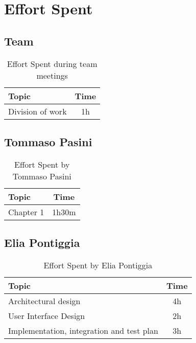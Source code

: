 \chapter{Effort Spent}

\section*{Team}


\begin{table}[H]
    \renewcommand{\arraystretch}{1.5}
    \centering
    \begin{tabular}{|l|c|}
        \hline
        \textbf{Topic}   & \textbf{Time} \\ \hline
        Division of work & 1h            \\ \hline
    \end{tabular}
    \caption{Effort Spent during team meetings}
    \label{tab:group-effort-spent}
\end{table}

\section*{Tommaso Pasini}
\begin{table}[H]
    \renewcommand{\arraystretch}{1.5}
    \centering
    \begin{tabular}{|l|c|}
        \hline
        \textbf{Topic}              & \textbf{Time}     \\ \hline
        Chapter 1                   & 1h30m             \\ \hline
        
    \end{tabular}
    \caption{Effort Spent by Tommaso Pasini}
    \label{tab:pasini-effort-spent}
\end{table}

\section*{Elia Pontiggia}
\begin{table}[H]
    \renewcommand{\arraystretch}{1.5}
    \centering
    \begin{tabular}{|l|c|}
        \hline
        \textbf{Topic}                            & \textbf{Time} \\ \hline
        Architectural design                      & 4h            \\ \hline
        User Interface Design                     & 2h            \\ \hline
        Implementation, integration and test plan & 3h            \\ \hline
    \end{tabular}
    \caption{Effort Spent by Elia Pontiggia}
    \label{tab:pontiggia-effort-spent}
\end{table}

